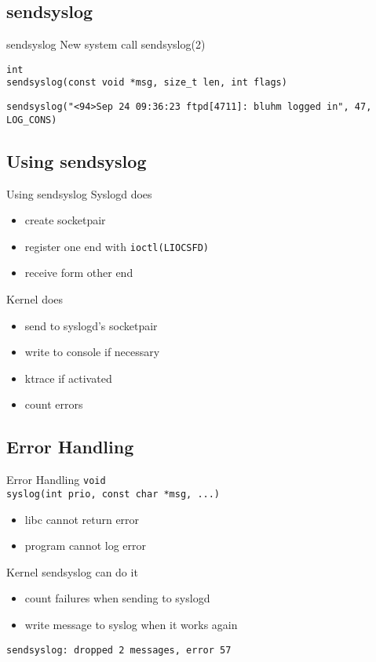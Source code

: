 \documentclass[14pt]{beamer}
\begin{document}
\subsection{sendsyslog}
\begin{frame}{sendsyslog}
    New system call sendsyslog(2)

    \vspace{.5cm}
    \texttt{int \\
    sendsyslog(const void *msg, size\_t len, int flags)}

    \vspace{.5cm}
    \texttt{sendsyslog("<94>Sep 24 09:36:23 ftpd[4711]:\
	bluhm logged in", 47, LOG\_CONS)}
\end{frame}

\subsection{Using sendsyslog}
\begin{frame}{Using sendsyslog}
    Syslogd does
\begin{itemize}
    \item create socketpair
    \item register one end with \texttt{ioctl(LIOCSFD)}
    \item receive form other end
\end{itemize}
    \vspace{.5cm}
    Kernel does
\begin{itemize}
    \item send to syslogd's socketpair
    \item write to console if necessary
    \item ktrace if activated
    \item count errors
\end{itemize}
\end{frame}

\subsection{Error Handling}
\begin{frame}{Error Handling}
    \texttt{void \\
	syslog(int prio, const char *msg, ...)}
\begin{itemize}
    \item libc cannot return error
    \item program cannot log error
\end{itemize}
    \vspace{.5cm}
    Kernel sendsyslog can do it
\begin{itemize}
    \item count failures when sending to syslogd
    \item write message to syslog when it works again
\end{itemize}
    \vspace{.5cm}
    \texttt{sendsyslog:\ dropped 2 messages, error 57}
\end{frame}
\end{document}
